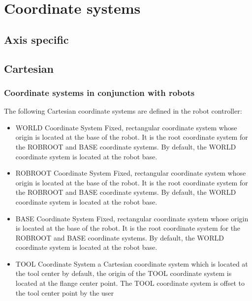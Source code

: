 \documentclass[a4paper]{report}
\begin{document}
	
\tableofcontents
\newpage		
		
\section{Coordinate systems}
\subsection{Axis specific}

\subsection{Cartesian}
\subsubsection{Coordinate systems in conjunction with robots}
The following Cartesian coordinate systems are defined in the robot controller:
\begin{itemize}
	\item WORLD Coordinate System
	\newline
	Fixed, rectangular coordinate system whose origin is located at the base of the robot. It is the root coordinate system for the ROBROOT and BASE coordinate systems.
	By default, the WORLD coordinate system is located at the robot base.
	\item ROBROOT Coordinate System
	\newline
	Fixed, rectangular coordinate system whose origin is located at the base of the robot. It is the root coordinate system for the ROBROOT and BASE coordinate systems.
	By default, the WORLD coordinate system is located at the robot base.
	\item BASE Coordinate System
	Fixed, rectangular coordinate system whose origin is located at the base of the robot. It is the root coordinate system for the ROBROOT and BASE coordinate systems.
	By default, the WORLD coordinate system is located at the robot base.
	\item TOOL Coordinate System
	\newline
	a Cartesian coordinate system which is located at the tool center by default, the origin of the TOOL coordinate system is located at the flange center point. The TOOL coordinate system is offset to the tool center point by the user

\end{itemize}
\end{document}
